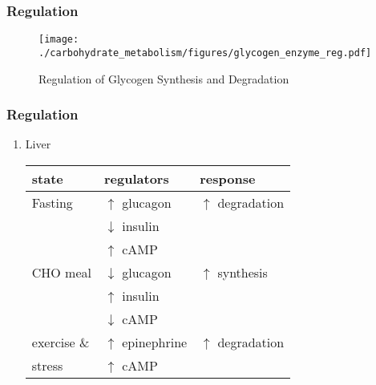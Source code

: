 \documentclass{scrartcl}
\begin{document}
\subsubsection{Regulation}
\label{sec:orgaa81acd}

\begin{figure}[htbp]
\centering
\texttt{[image: ./carbohydrate\_metabolism/figures/glycogen\_enzyme\_reg.pdf]}
\caption{\label{fig:org523f828}
Regulation of Glycogen Synthesis and Degradation}
\end{figure}

\subsubsection{Regulation}
\label{sec:orgcc818c0}
\begin{enumerate}
\item Liver
\label{sec:org94ab4f6}

\begin{center}
\begin{tabular}{lll}
state & regulators & response\\
\hline
Fasting & \(\uparrow\) glucagon & \(\uparrow\) degradation\\
 & \(\downarrow\) insulin & \\
 & \(\uparrow\) cAMP & \\
CHO meal & \(\downarrow\) glucagon & \(\uparrow\) synthesis\\
 & \(\uparrow\) insulin & \\
 & \(\downarrow\) cAMP & \\
exercise \& & \(\uparrow\) epinephrine & \(\uparrow\) degradation\\
stress & \(\uparrow\) cAMP & \\
\end{tabular}
\end{center}
\end{enumerate}
\end{document}
